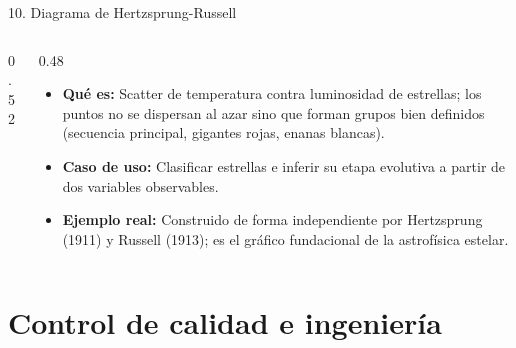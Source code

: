 \documentclass[aspectratio=169,9pt]{beamer}
\newcommand{\ficha}[3]{%
\begin{itemize}
\item \textbf{Qué es:} #1
\item \textbf{Caso de uso:} #2
\item \textbf{Ejemplo real:} #3
\end{itemize}}
\begin{document}
\begin{frame}{10. Diagrama de Hertzsprung-Russell}
\begin{columns}[T]
\begin{column}{0.52\textwidth}
\centering
{}
\end{column}
\begin{column}{0.48\textwidth}
\ficha{Scatter de temperatura contra luminosidad de estrellas; los puntos no se dispersan al azar sino que forman grupos bien definidos (secuencia principal, gigantes rojas, enanas blancas).}
{Clasificar estrellas e inferir su etapa evolutiva a partir de dos variables observables.}
{Construido de forma independiente por Hertzsprung (1911) y Russell (1913); es el gráfico fundacional de la astrofísica estelar.}
\end{column}
\end{columns}
\end{frame}

\section{Control de calidad e ingeniería}
\end{document}
